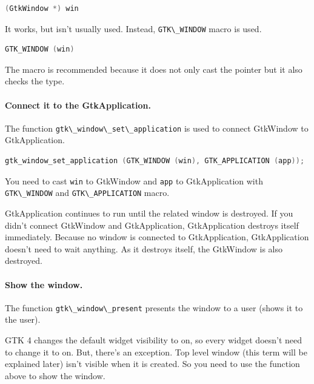 \begin{lstlisting}[language=C]
(GtkWindow *) win
\end{lstlisting}

It works, but isn't usually used. Instead,
\passthrough{\lstinline!GTK\_WINDOW!} macro is used.

\begin{lstlisting}[language=C]
GTK_WINDOW (win)
\end{lstlisting}

The macro is recommended because it does not only cast the pointer but
it also checks the type.

\paragraph{Connect it to the
GtkApplication.}\label{connect-it-to-the-gtkapplication.}

The function \passthrough{\lstinline!gtk\_window\_set\_application!} is
used to connect GtkWindow to GtkApplication.

\begin{lstlisting}[language=C]
gtk_window_set_application (GTK_WINDOW (win), GTK_APPLICATION (app));
\end{lstlisting}

You need to cast \passthrough{\lstinline!win!} to GtkWindow and
\passthrough{\lstinline!app!} to GtkApplication with
\passthrough{\lstinline!GTK\_WINDOW!} and
\passthrough{\lstinline!GTK\_APPLICATION!} macro.

GtkApplication continues to run until the related window is destroyed.
If you didn't connect GtkWindow and GtkApplication, GtkApplication
destroys itself immediately. Because no window is connected to
GtkApplication, GtkApplication doesn't need to wait anything. As it
destroys itself, the GtkWindow is also destroyed.

\paragraph{Show the window.}\label{show-the-window.}

The function \passthrough{\lstinline!gtk\_window\_present!} presents the
window to a user (shows it to the user).

GTK 4 changes the default widget visibility to on, so every widget
doesn't need to change it to on. But, there's an exception. Top level
window (this term will be explained later) isn't visible when it is
created. So you need to use the function above to show the window.

